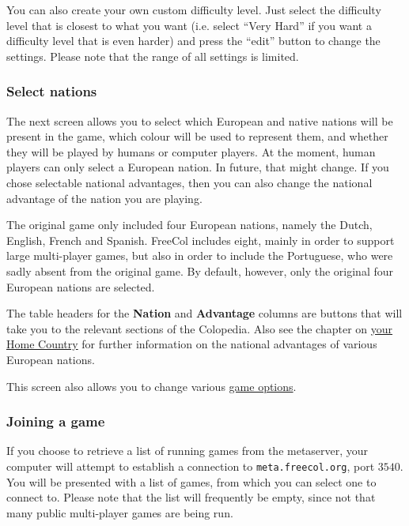 \documentclass[12pt]{book}
\begin{document}
You can also create your own custom difficulty level. Just select the
difficulty level that is closest to what you want (i.e. select ``Very
Hard'' if you want a difficulty level that is even harder) and press
the ``edit'' button to change the settings. Please note that the range
of all settings is limited.


\hypertarget{select nations}{\subsubsection{Select nations}}

The next screen allows you to select which European and native nations
will be present in the game, which colour will be used to represent
them, and whether they will be played by humans or computer
players. At the moment, human players can only select a European
nation. In future, that might change. If you chose selectable national
advantages, then you can also change the national advantage of the
nation you are playing.

The original game only included four European nations, namely the
Dutch, English, French and Spanish. FreeCol includes eight, mainly in
order to support large multi-player games, but also in order to
include the Portuguese, who were sadly absent from the original
game. By default, however, only the original four European nations are
selected.

The table headers for the {\bf Nation} and {\bf Advantage} columns are
buttons that will take you to the relevant sections of the
Colopedia. Also see the chapter on \hyperlink{Home Country}{your Home
  Country} for further information on the national advantages of
various European nations.

This screen also allows you to change various \hyperlink{game options}
{game options}.


\hypertarget{Joining a game}{\subsubsection{Joining a game}}

If you choose to retrieve a list of running games from the metaserver,
your computer will attempt to establish a connection to
\verb$meta.freecol.org$, port $3540$. You will be
presented with a list of games, from which you can select one to
connect to. Please note that the list will frequently be empty, since
not that many public multi-player games are being run.
\end{document}
